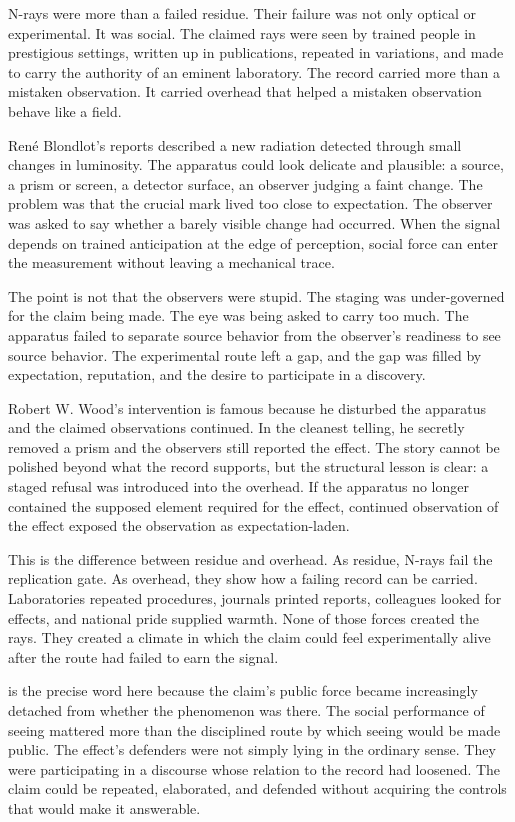 N-rays were more than a failed residue. Their failure was not only optical
or experimental. It was social. The
claimed rays were seen by trained people in prestigious settings, written up
in publications, repeated in variations, and made to carry the authority of an
eminent laboratory. The record carried more than a mistaken observation. It
carried overhead that helped a mistaken observation behave like a field.

René Blondlot's reports described a new radiation detected through small
changes in luminosity. The apparatus could look delicate and plausible: a
source, a prism or screen, a detector surface, an observer judging a faint
change. The problem was that the crucial mark lived too close to expectation.
The observer was asked to say whether a barely visible change had occurred. When
the signal depends on trained anticipation at the edge of perception, social
force can enter the measurement without leaving a mechanical trace.

The point is not that the observers were stupid. The staging was
under-governed for the claim being made. The eye was being asked to carry too
much. The apparatus failed to separate source behavior from the observer's
readiness to see source behavior. The experimental route left a
gap, and the gap was filled by expectation, reputation, and the desire to
participate in a discovery.

Robert W. Wood's intervention is famous because he disturbed the apparatus and
the claimed observations continued. In the cleanest telling, he secretly
removed a prism and the observers still reported the effect. The story cannot
be polished beyond what the record supports, but the structural lesson is
clear: a staged refusal was introduced into the overhead. If the apparatus no
longer contained the supposed element required for the effect, continued
observation of the effect exposed the observation as expectation-laden.

This is the difference between residue and overhead. As residue, N-rays fail
the replication gate. As overhead, they show how a failing record can be
carried. Laboratories repeated procedures, journals printed reports,
colleagues looked for effects, and national pride supplied warmth. None of
those forces created the rays. They created a climate in which the claim could
feel experimentally alive after the route had failed to earn the signal.

 is the precise word here because the claim's public force
became increasingly detached from whether the phenomenon was there. The social
performance of seeing mattered more than the disciplined route by which seeing
would be made public. The effect's defenders were not simply lying in the
ordinary sense. They were participating in a discourse whose relation to the
record had loosened. The claim could be repeated, elaborated, and defended
without acquiring the controls that would make it answerable.

